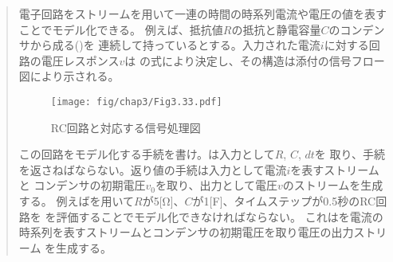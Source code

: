 \begin{quote}
電子回路をストリームを用いて一連の時間の時系列電流や電圧の値を表すことでモデル化できる。
例えば、抵抗値\( R \)の抵抗と静電容量\( C \)のコンデンサから成る()を
連続して持っているとする。入力された電流\( i \)に対する回路の電圧レスポンス\( v \)は
の式により決定し、その構造は添付の信号フロー図により示される。

\clearpage
\begin{figure}[tb]
\label{Figure 3.33}
\centering
\begin{comment}
\heading{Figure 3.33:} An RC circuit and the associated signal-flow diagram.

\begin{example}
  +        v        -

 ->----'\/\/\,---| |---
  i       R         C


                  / t
               1  |
 v  =  v   +  --- |  i dt  +  R i
        0      C  |
                  / 0

         +--------------+
     +-->|   scale: R   |---------------------+   |\_
     |   +--------------+                     |   |  \_
     |                                        +-->|    \   v
  i  |   +--------------+     +------------+      | add >--->
 ----+-->|  scale: 1/C  |---->|  integral  |----->|   _/
         +--------------+     +------------+      | _/
                                    |             |/
				   v
				    0
\end{example}
\end{comment}
\texttt{[image: fig/chap3/Fig3.33.pdf]}
\par\bigskip
\noindent
{} RC回路と対応する信号処理図
\end{figure}



この回路をモデル化する手続を書け。は入力として\( R \), \( C \), \( dt \)を
取り、手続を返さねばならない。返り値の手続は入力として電流\( i \)を表すストリームと
コンデンサの初期電圧\( v_0 \)を取り、出力として電圧\( v \)のストリームを生成する。
例えばを用いて\( R \)が5[Ω]、\( C \)が1[F]、タイムステップが0.5秒のRC回路を
を評価することでモデル化できなければならない。
これはを電流の時系列を表すストリームとコンデンサの初期電圧を取り電圧の出力ストリーム
を生成する。
\end{quote}

